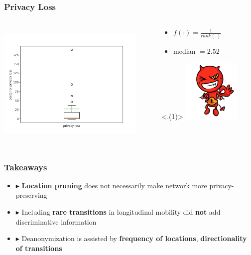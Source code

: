 \documentclass[hyperref={colorlinks = true},unknownkeysallowed]{beamer}
\begin{document}
\begin{frame}
	\frametitle{Privacy Loss}
	\begin{columns}
		\begin{column}{0.55\textwidth}
			\includegraphics[width=7cm, height=6cm]{figs/posterior_privloss_.pdf}
		\end{column}
		\begin{column}{0.45\textwidth}
			\vspace{1cm}
			\begin{itemize}
				\item $f(\cdot)=\frac{1}{rank(\cdot)}$
				\item median $ = 2.52 $
			\end{itemize}
		 {\includegraphics[width=3cm, height=3cm]{figs/adv_celebrating}}
		\end{column}
	\end{columns}
\end{frame}


\begin{frame}
	\frametitle{Takeaways}
	
	\begin{itemize}
		\item  $\blacktriangleright$ \textbf{Location pruning} does not necessarily make network more privacy-preserving
		\vspace{0.1cm}
		\item  $\blacktriangleright$ Including \textbf{rare transitions} in longitudinal mobility did \textbf{not} add discriminative
information
		\vspace{0.1cm}
		\item  $\blacktriangleright$ Deanonymization is assisted by \textbf{frequency of
locations}, \textbf{directionality of transitions}
	\end{itemize}
\end{frame}
\end{document}
